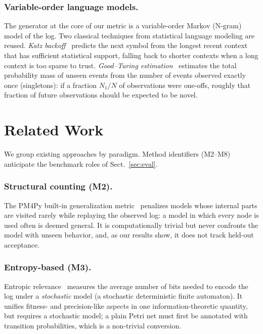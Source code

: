 \documentclass[runningheads]{llncs}
\begin{document}
\subsubsection{Variable-order language models.}
The generator at the core of our metric is a variable-order Markov (N-gram) model of the log. Two classical techniques from statistical language modeling are reused. \emph{Katz backoff}~\cite{katz1987} predicts the next symbol from the longest recent context that has sufficient statistical support, falling back to shorter contexts when a long context is too sparse to trust. \emph{Good--Turing estimation}~\cite{gale1995gt} estimates the total probability mass of unseen events from the number of events observed exactly once (singletons): if a fraction $N_1/N$ of observations were one-offs, roughly that fraction of future observations should be expected to be novel.

\section{Related Work}
\label{sec:related}

We group existing approaches by paradigm. Method identifiers (M2--M8) anticipate the benchmark roles of Sect.~\ref{sec:eval}.

\subsubsection{Structural counting (M2).}
The PM4Py built-in generalization metric~\cite{buijs2014quality,berti2019pm4py} penalizes models whose internal parts are visited rarely while replaying the observed log: a model in which every node is used often is deemed general. It is computationally trivial but never confronts the model with unseen behavior, and, as our results show, it does not track held-out acceptance.

\subsubsection{Entropy-based (M3).}
Entropic relevance~\cite{alkhammash2022entropic} measures the average number of bits needed to encode the log under a \emph{stochastic} model (a stochastic deterministic finite automaton). It unifies fitness- and precision-like aspects in one information-theoretic quantity, but requires a stochastic model; a plain Petri net must first be annotated with transition probabilities, which is a non-trivial conversion.
\end{document}
